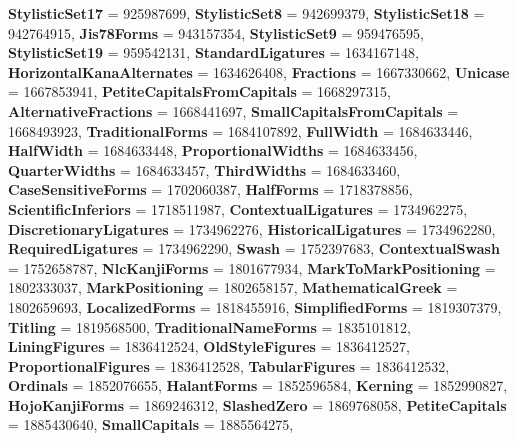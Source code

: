 \begin{DoxyCompactItemize}
{\bfseries Stylistic\+Set17} = 925987699, 
{\bfseries Stylistic\+Set8} = 942699379, 
{\bfseries Stylistic\+Set18} = 942764915, 
{\bfseries Jis78\+Forms} = 943157354, 
\newline
{\bfseries Stylistic\+Set9} = 959476595, 
{\bfseries Stylistic\+Set19} = 959542131, 
{\bfseries Standard\+Ligatures} = 1634167148, 
{\bfseries Horizontal\+Kana\+Alternates} = 1634626408, 
\newline
{\bfseries Fractions} = 1667330662, 
{\bfseries Unicase} = 1667853941, 
{\bfseries Petite\+Capitals\+From\+Capitals} = 1668297315, 
{\bfseries Alternative\+Fractions} = 1668441697, 
\newline
{\bfseries Small\+Capitals\+From\+Capitals} = 1668493923, 
{\bfseries Traditional\+Forms} = 1684107892, 
{\bfseries Full\+Width} = 1684633446, 
{\bfseries Half\+Width} = 1684633448, 
\newline
{\bfseries Proportional\+Widths} = 1684633456, 
{\bfseries Quarter\+Widths} = 1684633457, 
{\bfseries Third\+Widths} = 1684633460, 
{\bfseries Case\+Sensitive\+Forms} = 1702060387, 
\newline
{\bfseries Half\+Forms} = 1718378856, 
{\bfseries Scientific\+Inferiors} = 1718511987, 
{\bfseries Contextual\+Ligatures} = 1734962275, 
{\bfseries Discretionary\+Ligatures} = 1734962276, 
\newline
{\bfseries Historical\+Ligatures} = 1734962280, 
{\bfseries Required\+Ligatures} = 1734962290, 
{\bfseries Swash} = 1752397683, 
{\bfseries Contextual\+Swash} = 1752658787, 
\newline
{\bfseries Nlc\+Kanji\+Forms} = 1801677934, 
{\bfseries Mark\+To\+Mark\+Positioning} = 1802333037, 
{\bfseries Mark\+Positioning} = 1802658157, 
{\bfseries Mathematical\+Greek} = 1802659693, 
\newline
{\bfseries Localized\+Forms} = 1818455916, 
{\bfseries Simplified\+Forms} = 1819307379, 
{\bfseries Titling} = 1819568500, 
{\bfseries Traditional\+Name\+Forms} = 1835101812, 
\newline
{\bfseries Lining\+Figures} = 1836412524, 
{\bfseries Old\+Style\+Figures} = 1836412527, 
{\bfseries Proportional\+Figures} = 1836412528, 
{\bfseries Tabular\+Figures} = 1836412532, 
\newline
{\bfseries Ordinals} = 1852076655, 
{\bfseries Halant\+Forms} = 1852596584, 
{\bfseries Kerning} = 1852990827, 
{\bfseries Hojo\+Kanji\+Forms} = 1869246312, 
\newline
{\bfseries Slashed\+Zero} = 1869768058, 
{\bfseries Petite\+Capitals} = 1885430640, 
{\bfseries Small\+Capitals} = 1885564275, 

\end{DoxyCompactItemize}
